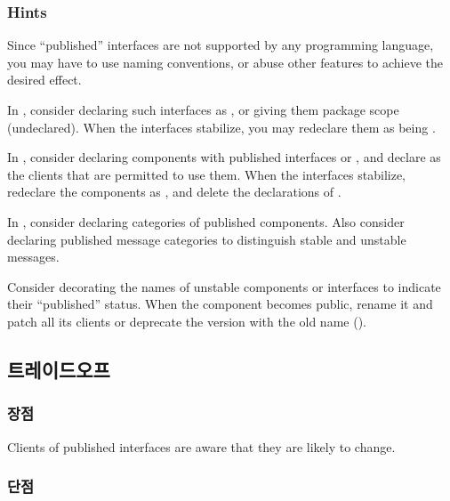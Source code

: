 \documentclass[a4paper,10pt,twoside]{book}
\begin{document}
\subsubsection*{Hints}

Since ``published'' interfaces are not supported by any programming language, you may have to use naming conventions, or abuse other features to achieve the desired effect.

\begin{bulletlist}
\item In , consider declaring such interfaces as , or giving them package scope (undeclared). When the interfaces stabilize, you may redeclare them as being .

\item In , consider declaring components with published interfaces  or , and declare as  the clients that are permitted to use them. When the interfaces stabilize, redeclare the components as , and delete the declarations of .

\item In , consider declaring categories of published components. Also consider declaring published message categories to distinguish stable and unstable messages.

\item Consider decorating the names of unstable components or interfaces to indicate their ``published'' status. When the component becomes public, rename it and patch all its clients or deprecate the version with the old name ().
\end{bulletlist}

\subsection*{트레이드오프}

\subsubsection*{장점}

\begin{bulletlist}
\item Clients of published interfaces are aware that they are likely to change.
\end{bulletlist}

\subsubsection*{단점}
\end{document}
